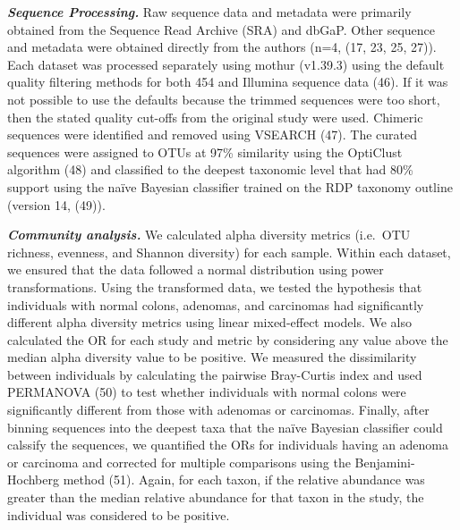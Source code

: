 \documentclass[12pt,]{article}
\begin{document}
\textbf{\emph{Sequence Processing.}} Raw sequence data and metadata were
primarily obtained from the Sequence Read Archive (SRA) and dbGaP. Other
sequence and metadata were obtained directly from the authors (n=4, (17,
23, 25, 27)). Each dataset was processed separately using mothur
(v1.39.3) using the default quality filtering methods for both 454 and
Illumina sequence data (46). If it was not possible to use the defaults
because the trimmed sequences were too short, then the stated quality
cut-offs from the original study were used. Chimeric sequences were
identified and removed using VSEARCH (47). The curated sequences were
assigned to OTUs at 97\% similarity using the OptiClust algorithm (48)
and classified to the deepest taxonomic level that had 80\% support
using the naïve Bayesian classifier trained on the RDP taxonomy outline
(version 14, (49)).

\textbf{\emph{Community analysis.}} We calculated alpha diversity
metrics (i.e.~OTU richness, evenness, and Shannon diversity) for each
sample. Within each dataset, we ensured that the data followed a normal
distribution using power transformations. Using the transformed data, we
tested the hypothesis that individuals with normal colons, adenomas, and
carcinomas had significantly different alpha diversity metrics using
linear mixed-effect models. We also calculated the OR for each study and
metric by considering any value above the median alpha diversity value
to be positive. We measured the dissimilarity between individuals by
calculating the pairwise Bray-Curtis index and used PERMANOVA (50) to
test whether individuals with normal colons were significantly different
from those with adenomas or carcinomas. Finally, after binning sequences
into the deepest taxa that the naïve Bayesian classifier could calssify
the sequences, we quantified the ORs for individuals having an adenoma
or carcinoma and corrected for multiple comparisons using the
Benjamini-Hochberg method (51). Again, for each taxon, if the relative
abundance was greater than the median relative abundance for that taxon
in the study, the individual was considered to be positive.
\end{document}
